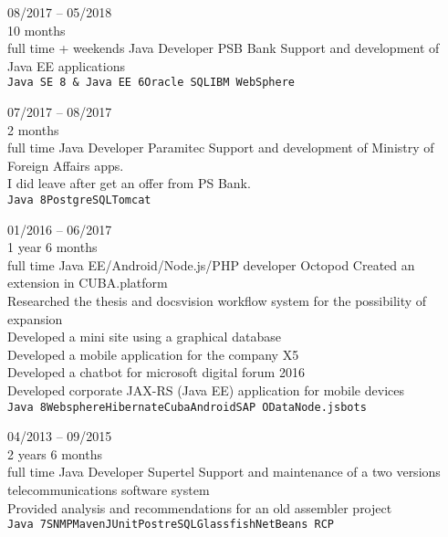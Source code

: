 \begin{entrylist}
    \entry
    {08/2017 -- 05/2018\\\footnotesize{10 months\\full time + weekends}}
    {Java Developer}
    {PSB Bank}
    {
        Support and development of Java EE applications \\
        \texttt{Java SE 8 \& Java EE 6}\slashsep\texttt{Oracle SQL}\slashsep\texttt{IBM WebSphere}
    }
    
    \entry
    {07/2017 -- 08/2017\\\footnotesize{2 months\\full time}}
    {Java Developer}
    {Paramitec}
    {
        Support and development of Ministry of Foreign Affairs apps. \\
        I did leave after get an offer from PS Bank. \\
        \texttt{Java 8}\slashsep\texttt{PostgreSQL}\slashsep\texttt{Tomcat}
    }
    
    \entry
    {01/2016 -- 06/2017\\\footnotesize{1 year 6 months\\full time}}
    {Java EE/Android/Node.js/PHP developer}
    {Octopod}
    {
        Created an extension in CUBA.platform \\
        Researched the thesis and docsvision workflow system for the possibility of expansion \\
        Developed a mini site using a graphical database \\
        Developed a mobile application for the company X5 \\
        Developed a chatbot for microsoft digital forum 2016 \\
        Developed corporate JAX-RS (Java EE) application for mobile devices\\
    \texttt{Java 8}\slashsep\texttt{Websphere}\slashsep\texttt{Hibernate}\slashsep\texttt{Cuba}\slashsep\texttt{Android}\slashsep\texttt{SAP OData}\slashsep\texttt{Node.js}\slashsep\texttt{bots}
	}
    
    \entry
    {04/2013 -- 09/2015\\\footnotesize{2 years 6 months\\full time}}
    {Java Developer}
    {Supertel}
    {
        Support and maintenance of a two versions telecommunications software system \\
        Provided analysis and recommendations for an old assembler project \\
        \texttt{Java 7}\slashsep\texttt{SNMP}\slashsep\texttt{Maven}\slashsep\texttt{JUnit}\slashsep\texttt{PostreSQL}\slashsep\texttt{Glassfish}\slashsep\texttt{NetBeans RCP}
    }


\end{entrylist}

